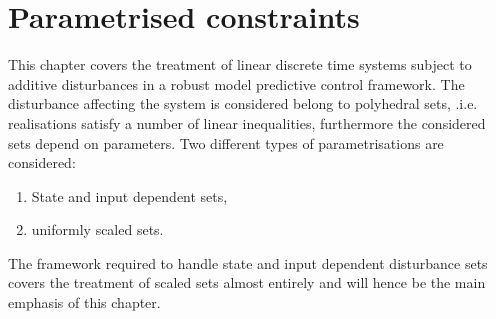 
\chapter{Parametrised constraints}\label{chapter:parametrised:constraints}
This chapter covers the treatment of linear discrete time systems subject to additive 
disturbances in a robust model predictive control framework.
%
The disturbance affecting the system is considered belong to polyhedral sets, .i.e.
realisations satisfy a number of linear inequalities, furthermore the considered sets 
depend on parameters. 
%
Two different types of parametrisations are considered: 
%
\begin{enumerate}
\item State and input dependent sets,
\item uniformly scaled sets.
\end{enumerate}
%
The framework required to handle state and input dependent disturbance sets covers the 
treatment of scaled sets almost entirely and will hence be the main emphasis of this
chapter.
%
%
